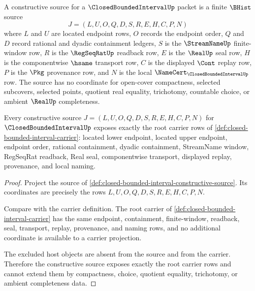 
\begin{definition}
\label{def:closed-bounded-interval-constructive-source}
A constructive source for a $\ClosedBoundedIntervalUp$ packet is a finite $\BHist$ source
$$
J=(L,U,O,Q,D,S,R,E,H,C,P,N)
$$
where $L$ and $U$ are located endpoint rows, $O$ records the endpoint order, $Q$ and $D$ record rational and dyadic containment ledgers, $S$ is the $\StreamNameUp$ finite-window row, $R$ is the $\RegSeqRatUp$ readback row, $E$ is the $\RealUp$ seal row, $H$ is the componentwise $\hsame$ transport row, $C$ is the displayed $\Cont$ replay row, $P$ is the $\Pkg$ provenance row, and $N$ is the local $\NameCert_{\ClosedBoundedIntervalUp}$ row. The source has no coordinate for open-cover compactness, selected subcovers, selected points, quotient real equality, trichotomy, countable choice, or ambient $\RealUp$ completeness.
\end{definition}

\begin{theorem}
\label{thm:closed-bounded-interval-constructive-carrier}
Every constructive source $J=(L,U,O,Q,D,S,R,E,H,C,P,N)$ for $\ClosedBoundedIntervalUp$ exposes exactly the root carrier rows of \autoref{def:closed-bounded-interval-carrier}: located lower endpoint, located upper endpoint, endpoint order, rational containment, dyadic containment, StreamName window, RegSeqRat readback, Real seal, componentwise transport, displayed replay, provenance, and local naming.
\end{theorem}
\begin{proof}
Project the source of \autoref{def:closed-bounded-interval-constructive-source}. Its coordinates are precisely the rows $L,U,O,Q,D,S,R,E,H,C,P,N$.

Compare with the carrier definition. The root carrier of \autoref{def:closed-bounded-interval-carrier} has the same endpoint, containment, finite-window, readback, seal, transport, replay, provenance, and naming rows, and no additional coordinate is available to a carrier projection.

The excluded host objects are absent from the source and from the carrier. Therefore the constructive source exposes exactly the root carrier rows and cannot extend them by compactness, choice, quotient equality, trichotomy, or ambient completeness data.
\end{proof}


